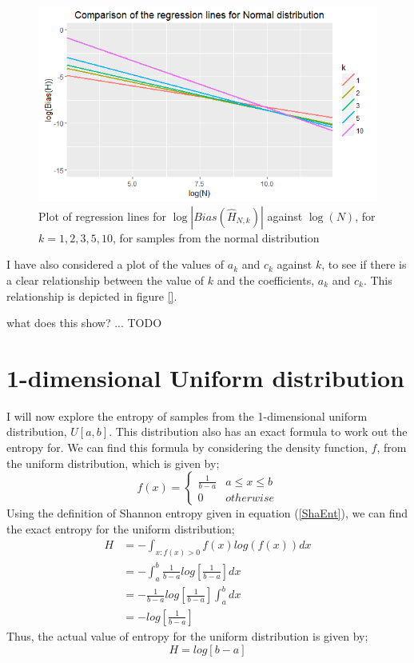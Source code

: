 \documentclass{report}
\begin{document}
\begin{figure}
  \begin{center}
    \includegraphics[width=\textwidth]{./Graphs/Normal_comparison.png}
  \end{center}
\caption{Plot of regression lines for $\log|Bias(\hat{H}_{N, k})|$ against $\log(N)$, for $k=1, 2, 3, 5, 10$, for samples from the normal distribution}
  \label{normal_comparison_graph}
\end{figure}

I have also considered a plot of the values of $a_{k}$ and $c_{k}$ against $k$, to see if there is a clear relationship between the value of $k$ and the coefficients,  $a_{k}$ and $c_{k}$. This relationship is depicted in figure \ref{}.

what does this show? ... TODO







\section{1-dimensional Uniform distribution} \label{Uniform_d=1}

I will now explore the entropy of samples from the 1-dimensional uniform distribution, $U[a, b]$. This distribution also has an exact formula to work out the entropy for. We can find this formula by considering the density function, $f$, from the uniform distribution, which is given by;
\[
f(x) =  \begin{cases} 
      \frac{1}{b-a} & a \leq x \leq b \\
      0 & otherwise
   \end{cases}
\]
Using the definition of Shannon entropy given in equation (\ref{ShaEnt}), we can find the exact entropy for the uniform distribution;
\begin{align*}
H &= - \int_{x : f(x) > 0} f(x) log(f(x)) dx \\ 
&= - \int_{a}^{b} \frac{1}{b-a} log \left[ \frac{1}{b-a} \right] dx  \\
&= - \frac{1}{b-a} log \left[ \frac{1}{b-a} \right]  \int_{a}^{b} dx  \\
&= -  log  \left[ \frac{1}{b-a} \right] 
\end{align*}
Thus, the actual value of entropy for the uniform distribution is given by;
\begin{equation} \label{UnifEnt}
H = log [ b-a ]
\end{equation}
\end{document}
